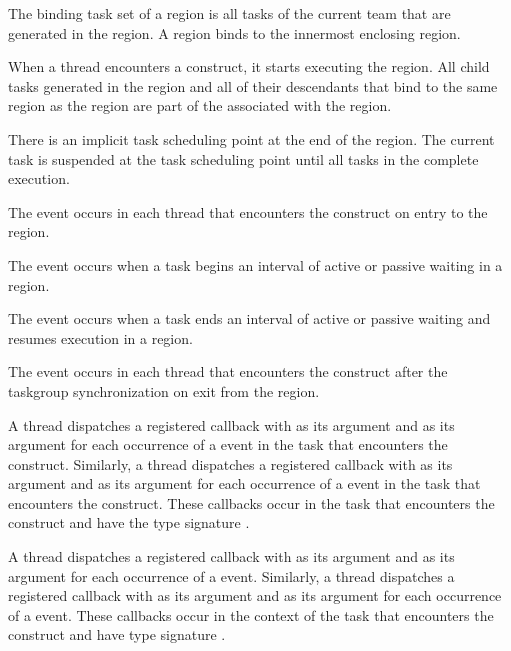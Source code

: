 \binding
The binding task set of a  region is all tasks of the 
current team that are generated in the region. A  region 
binds to the innermost enclosing  region.

\descr
When a thread encounters a  construct, it starts executing
the region. All child tasks generated in the  region and all
of their descendants that bind to the same  region as the
 region are part of the  associated with
the  region.

There is an implicit task scheduling point at the end of the 
region. The current task is suspended at the task scheduling point until all
tasks in the  complete execution.

\events

The  event occurs in each thread that encounters the
 construct on entry to the  region.

The  event occurs when a task begins an interval 
of active or passive waiting in a  region.

The  event occurs when a task ends an interval of 
active or passive waiting and resumes execution in a  region.

The  event occurs in each thread that encounters the
 construct after the taskgroup synchronization on exit from the
 region.

\tools

A thread dispatches a registered 
callback with  as its  argument
and  as its  argument for each
occurrence of a  event in the task that encounters
the  construct. Similarly, a thread dispatches a registered
 callback with 
as its  argument and  as its 
argument for each  occurrence of a  event in the task that
encounters the  construct. These callbacks occur in the task that
encounters the  construct and have the type signature
.

A thread dispatches a registered  callback
with  as its  argument and
 as its  argument for each occurrence of
a  event. Similarly, a thread dispatches a registered
 callback with 
as its  argument and  as its  argument
for each occurrence of a  event. These callbacks occur in the
context of the task that encounters the  construct and have type
signature .


